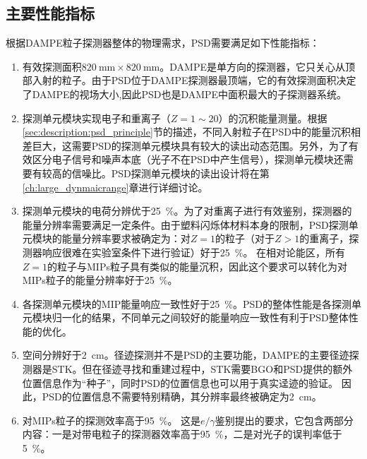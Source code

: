 \subsection{主要性能指标}
根据DAMPE粒子探测器整体的物理需求，PSD需要满足如下性能指标：
\begin{enumerate}[noitemsep,topsep=0pt]
	\item 有效探测面积$\SI{820}{\milli\meter}\times\SI{820}{\milli\meter}$。DAMPE是单方向的探测器，它只关心从顶部入射的粒子。由于PSD位于DAMPE探测器最顶端，它的有效探测面积决定了DAMPE的视场大小,因此PSD也是DAMPE中面积最大的子探测器系统。
	\item 探测单元模块实现电子和重离子（$Z=1\sim20$）的沉积能量测量。根据\ref{sec:description:psd_principle}节的描述，不同入射粒子在PSD中的能量沉积相差巨大，这需要PSD的探测单元模块具有较大的读出动态范围。另外，为了有效区分电子信号和噪声本底（光子不在PSD中产生信号），探测单元模块还需要有较高的信噪比。PSD探测单元模块的读出设计将在第\ref{ch:large_dynmaicrange}章进行详细讨论。
	\item 探测单元模块的电荷分辨优于\SI{25}{\percent}。为了对重离子进行有效鉴别，探测器的能量分辨率需要满足一定条件。由于塑料闪烁体材料本身的限制，PSD探测单元模块的能量分辨率要求被确定为：对$Z=1$的粒子（对于$Z>1$的重离子，探测器响应很难在实验室条件下进行验证）好于\SI{25}{\percent}。
	在相对论能区，所有$Z=1$的粒子与MIPs粒子具有类似的能量沉积，因此这个要求可以转化为对MIPs粒子的能量分辨率好于\SI{25}{\percent}。
	\item 各探测单元模块的MIP能量响应一致性好于\SI{25}{\percent}。PSD的整体性能是各探测单元模块归一化的结果，不同单元之间较好的能量响应一致性有利于PSD整体性能的优化。
	\item 空间分辨好于\SI{2}{\centi\meter}。径迹探测并不是PSD的主要功能，DAMPE的主要径迹探测器是STK。但在径迹寻找和重建过程中，STK需要BGO和PSD提供的额外位置信息作为“种子”，同时PSD的位置信息也可以用于真实迳迹的验证。
	因此，PSD的位置信息不需要特别精确，其分辨率最终被确定为\SI{2}{\centi\meter}。
	\item 对MIPs粒子的探测效率高于\SI{95}{\percent}。
	这是$e/\gamma$鉴别提出的要求，它包含两部分内容：一是对带电粒子的探测器效率高于\SI{95}{\percent}，二是对光子的误判率低于\SI{5}{\percent}。
\end{enumerate}

